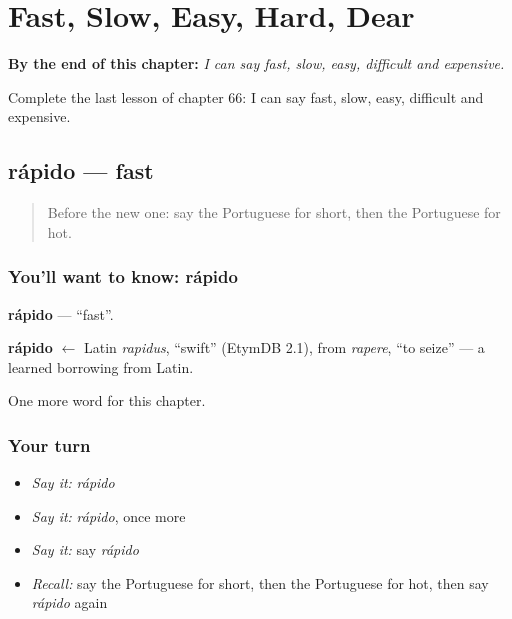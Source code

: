 
\chapter{Fast, Slow, Easy, Hard, Dear}
\label{ch:pt-fast-slow-easy-hard-dear}

\begin{chapteropening}
\textbf{By the end of this chapter:} \emph{I can say fast, slow, easy, difficult and expensive.}

Complete the last lesson of chapter 66: I can say fast, slow, easy, difficult and expensive.
\end{chapteropening}

\section[rápido]{rápido — fast}

\label{lesson:PT-C66-rapido}



\begin{quote}
Before the new one: say the Portuguese for short, then the Portuguese for hot.
\end{quote}

\subsection*{You'll want to know: rápido}
\textbf{rápido} — \textquotedblleft{}fast\textquotedblright{}.

\begin{cousinweb}
\textbf{rápido} $\leftarrow$ Latin \emph{rapidus}, \textquotedblleft{}swift\textquotedblright{} (EtymDB 2.1), from \emph{rapere}, \textquotedblleft{}to seize\textquotedblright{} — a learned borrowing from Latin.
\end{cousinweb}

\begin{grammarlens}[title={What you've built}]
One more word for this chapter.
\end{grammarlens}

\subsection*{Your turn}
\begin{itemize}
\raggedright
  \item \emph{Say it:} \emph{rápido}
  \item \emph{Say it:} \emph{rápido}, once more
  \item \emph{Say it:} say \emph{rápido}
  \item \emph{Recall:} say the Portuguese for short, then the Portuguese for hot, then say \emph{rápido} again
\end{itemize}

